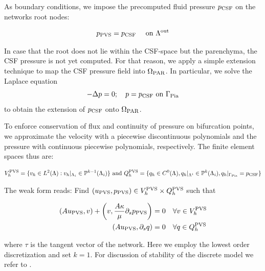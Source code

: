 \documentclass[fleqn,10pt]{wlscirep}
\begin{document}
As boundary conditions, we impose the precomputed fluid pressure $p_{\rm CSF}$ on the networks root nodes:

\begin{equation}
    p_{\rm PVS} = p_{\rm CSF} \quad \text{ on } \Lambda^{\rm out}
\end{equation}

In case that the root does not lie within the CSF-space but the parenchyma, the CSF pressure is not yet computed. For that reason, we apply a simple extension technique to map the CSF pressure field into $\Omega_{\rm PAR}$.
In particular, we solve the Laplace equation
\begin{equation}
    - \Delta p = 0; \quad p = p_{\rm CSF} \text{ on } \Gamma_{\rm Pia}
\end{equation}
to obtain the extension of $p_{\rm CSF}$ onto $\Omega_{\rm PAR}$.

To enforce conservation of flux and continuity of pressure on bifurcation points, we approximate the velocity with a piecewise discontinuous polynomials and the pressure with continuous piecewise polynomials, respectively. The finite element spaces thus are:

\begin{align}
   V_h^{\rm PVS} = \{v_h \in L^2(\Lambda): v_h \vert_{\Lambda_i} \in
   \mathbb{P}^{k -1}(\Lambda_i)\} \text{ and }
   Q_h^{\rm PVS} = \{ q_h \in C^0(\Lambda),  q_h \vert_{\Lambda^i} \in \mathbb{P}^k(\Lambda_i), q_h \vert_{\Gamma_{\rm Pia}} = p_{\rm CSF} \}
\end{align}

The weak form reads: Find $(u_{\rm PVS}, p_{\rm PVS}) \in V_h^{\rm PVS} \times Q_h^{\rm PVS}$ such that

\begin{align}
(A u_{\rm PVS}, v) + \left(v, \frac{A \kappa}{\mu} \partial_s p_{\rm PVS}  \right) &= 0 \quad \forall v \in V_h^{\rm PVS} \\
(A u_{\rm PVS} , \partial_s q ) &= 0 \quad  \forall q \in  Q_h^{\rm PVS}
\end{align}

where $\tau$ is the tangent vector of the network. Here we employ the lowest order discretization and set $k=1$. For discussion of stability of the discrete model we refer to \cite{gjerde2024directional}. 
\end{document}
